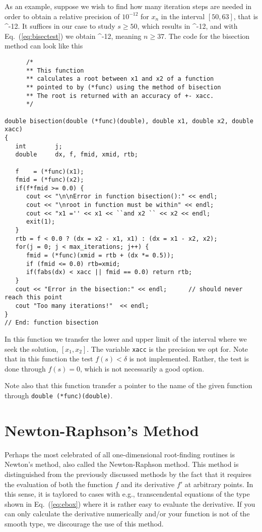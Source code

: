 As an example, suppose we wish to find how many iteration steps are needed
in order to obtain a relative precision of $10^{-12}$ for $x_n$ in the
interval $[50,63]$, that is
\be
     ^{-12}.
\ee
It suffices in our case to study $s \ge 50$, which results in 
\be
     ^{-12},
\ee
and with Eq.~(\ref{eq:bisectest}) we obtain
\be
   ^{-12},
\ee
meaning $n \ge 37$. 
The code for the bisection method can look like this
\lstset{language=c++}
\begin{lstlisting}
      /*
      ** This function
      ** calculates a root between x1 and x2 of a function
      ** pointed to by (*func) using the method of bisection  
      ** The root is returned with an accuracy of +- xacc.
      */

double bisection(double (*func)(double), double x1, double x2, double xacc)
{
   int        j;
   double     dx, f, fmid, xmid, rtb;

   f    = (*func)(x1);
   fmid = (*func)(x2);
   if(f*fmid >= 0.0) {
      cout << "\n\nError in function bisection():" << endl;
      cout << "\nroot in function must be within" << endl;
      cout << "x1 ='' << x1 << ``and x2 `` << x2 << endl;
      exit(1);
   }    
   rtb = f < 0.0 ? (dx = x2 - x1, x1) : (dx = x1 - x2, x2);
   for(j = 0; j < max_iterations; j++) {
      fmid = (*func)(xmid = rtb + (dx *= 0.5));
      if (fmid <= 0.0) rtb=xmid;
      if(fabs(dx) < xacc || fmid == 0.0) return rtb;
   }
   cout << "Error in the bisection:" << endl;      // should never reach this point
   cout "Too many iterations!"  << endl;
} 
// End: function bisection
\end{lstlisting}
In this function we transfer the lower and upper limit of the
interval where we seek the solution, $[x_1,x_2]$. The variable 
\verb$xacc$ is the precision we opt for. Note that in this function 
the test $f(s) < \delta $ is not implemented. Rather, the test
is done through $f(s)=0$, which is not necessarily a good option. 

Note also that this function transfer a pointer to the name
of the given function through \lstinline{double (*func)(double)}.

\section{Newton-Raphson's Method} \label{sec:nr}

Perhaps the most celebrated of all one-dimensional root-finding routines is Newton's
method, also called the Newton-Raphson method. This method is distinguished
from the previously discussed methods
by  the fact that it requires the evaluation
of both the function $f$ and its derivative $f'$ at arbitrary points. In this sense,
it is taylored to cases with e.g., transcendental equations of the type
shown in Eq.\ (\ref{eq:ebox}) where it is rather easy to evaluate the derivative.
If you can only calculate the derivative numerically and/or your function
is not of the smooth type, we discourage the use of this method. 

